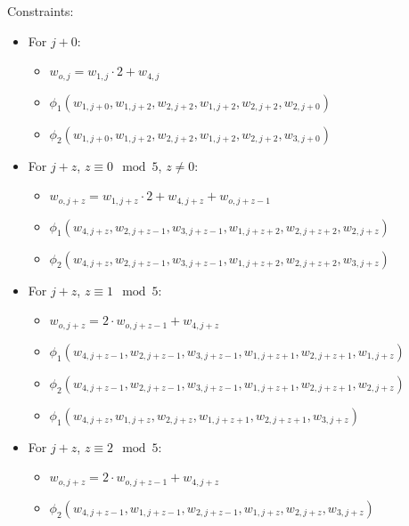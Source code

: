 Constraints:
\begin{itemize}
    \item For $j + 0$:
        \begin{itemize}
            \item $w_{o, j} = w_{1, j} \cdot 2 + w_{4, j}$
            \item $\phi_1(w_{1, j + 0}, w_{1, j + 2}, w_{2, j + 2}, w_{1, j + 2}, w_{2, j + 2}, w_{2, j + 0})$
            \item $\phi_2(w_{1, j + 0}, w_{1, j + 2}, w_{2, j + 2}, w_{1, j + 2}, w_{2, j + 2}, w_{3, j + 0})$
        \end{itemize}
    \item For $j + z$, $z \equiv 0 \mod 5$, $z \neq 0$:
        \begin{itemize}
            \item $w_{o, j + z} = w_{1, j + z} \cdot 2 + w_{4, j + z} + w_{o, j + z - 1}$
            \item $\phi_1(w_{4, j + z}, w_{2, j + z - 1}, w_{3, j + z - 1}, w_{1, j + z + 2}, w_{2, j + z + 2}, w_{2, j + z})$
            \item $\phi_2(w_{4, j + z}, w_{2, j + z - 1}, w_{3, j + z - 1}, w_{1, j + z + 2}, w_{2, j + z + 2}, w_{3, j + z})$
        \end{itemize}
    \item For $j + z$, $z \equiv 1 \mod 5$:
        \begin{itemize}
            \item $w_{o, j + z} = 2 \cdot w_{o, j + z - 1} + w_{4, j + z}$
            \item $\phi_1(w_{4, j + z - 1}, w_{2, j + z - 1}, w_{3, j + z - 1}, w_{1, j + z + 1}, w_{2, j + z + 1}, w_{1, j + z})$
            \item $\phi_2(w_{4, j + z - 1}, w_{2, j + z - 1}, w_{3, j + z - 1}, w_{1, j + z + 1}, w_{2, j + z + 1}, w_{2, j + z})$
            \item $\phi_1(w_{4, j + z }, w_{1, j + z }, w_{2, j + z }, w_{1, j + z + 1}, w_{2, j + z + 1}, w_{3, j + z})$
        \end{itemize}
    \item For $j + z$, $z \equiv 2 \mod 5$:
        \begin{itemize}
            \item $w_{o, j + z} = 2 \cdot w_{o, j + z - 1} + w_{4, j + z}$
            \item $\phi_2(w_{4, j + z - 1}, w_{1, j + z - 1}, w_{2, j + z - 1}, w_{1, j + z}, w_{2, j + z}, w_{3, j + z})$

\end{itemize}
\end{itemize}
